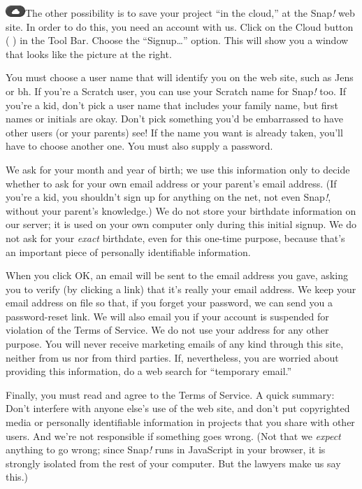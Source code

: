 \includegraphics[width=0.29167in,height=0.16667in]{media/image489.png}The
other possibility is to save your project ``in the cloud,'' at the
Snap\emph{!} web site. In order to do this, you need an account with us.
Click on the Cloud button ( ) in the Tool Bar. Choose the
``Signup\ldots'' option. This will show you a window that looks like the
picture at the right.

You must choose a user name that will identify you on the web site, such
as Jens or bh. If you're a Scratch user, you can use your Scratch name
for Snap\emph{!} too. If you're a kid, don't pick a user name that
includes your family name, but first names or initials are okay. Don't
pick something you'd be embarrassed to have other users (or your
parents) see! If the name you want is already taken, you'll have to
choose another one. You must also supply a password.

We ask for your month and year of birth; we use this information only to
decide whether to ask for your own email address or your parent's email
address. (If you're a kid, you shouldn't sign up for anything on the
net, not even Snap\emph{!}, without your parent's knowledge.) We do not
store your birthdate information on our server; it is used on your own
computer only during this initial signup. We do not ask for your
\emph{exact} birthdate, even for this one-time purpose, because that's
an important piece of personally identifiable information.

When you click OK, an email will be sent to the email address you gave,
asking you to verify (by clicking a link) that it's really your email
address. We keep your email address on file so that, if you forget your
password, we can send you a password-reset link. We will also email you
if your account is suspended for violation of the Terms of Service. We
do not use your address for any other purpose. You will never receive
marketing emails of any kind through this site, neither from us nor from
third parties. If, nevertheless, you are worried about providing this
information, do a web search for ``temporary email.''

Finally, you must read and agree to the Terms of Service. A quick
summary: Don't interfere with anyone else's use of the web site, and
don't put copyrighted media or personally identifiable information in
projects that you share with other users. And we're not responsible if
something goes wrong. (Not that we \emph{expect} anything to go wrong;
since Snap\emph{!} runs in JavaScript in your browser, it is strongly
isolated from the rest of your computer. But the lawyers make us say
this.)

